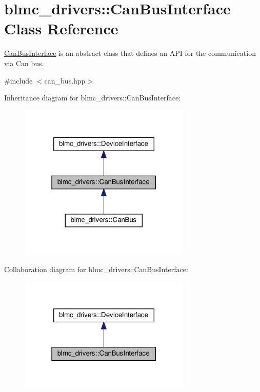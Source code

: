 \hypertarget{classblmc__drivers_1_1CanBusInterface}{}\section{blmc\+\_\+drivers\+:\+:Can\+Bus\+Interface Class Reference}
\label{classblmc__drivers_1_1CanBusInterface}


\hyperlink{classblmc__drivers_1_1CanBusInterface}{Can\+Bus\+Interface} is an abstract class that defines an A\+PI for the communication via Can bus.  




{\ttfamily \#include $<$can\+\_\+bus.\+hpp$>$}



Inheritance diagram for blmc\+\_\+drivers\+:\+:Can\+Bus\+Interface\+:
\nopagebreak
\begin{figure}[H]
\begin{center}
\leavevmode
\includegraphics[width=232pt]{classblmc__drivers_1_1CanBusInterface__inherit__graph}
\end{center}
\end{figure}


Collaboration diagram for blmc\+\_\+drivers\+:\+:Can\+Bus\+Interface\+:
\nopagebreak
\begin{figure}[H]
\begin{center}
\leavevmode
\includegraphics[width=232pt]{classblmc__drivers_1_1CanBusInterface__coll__graph}
\end{center}
\end{figure}

